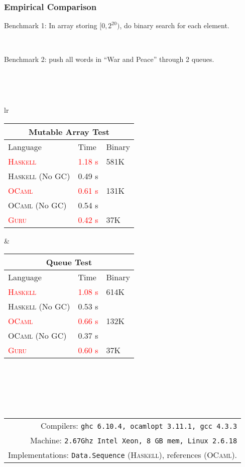 \documentclass[10pt]{beamer}
\begin{document}
\begin{frame}
\frametitle{Empirical Comparison}
Benchmark 1: In array storing $[0,2^{20})$, do binary search for each element.

\ 

Benchmark 2: push all words in ``War and Peace'' through 2 queues.

\ 

\ 


{\footnotesize
\begin{tabular}{lr}
\begin{tabular}{| l | l | l |}
\hline
\multicolumn{3}{|c|}{Mutable Array Test} \\
\hline
Language & Time & Binary \\
\hline
\textcolor{red}{\textsc{Haskell}} & \textcolor{red}{1.18 s} & 581K\\
\textsc{Haskell} (No GC) & 0.49 s & \ \\
\textcolor{red}{\textsc{OCaml}} & \textcolor{red}{0.61 s}  & 131K\\
\textsc{OCaml} (No GC) & 0.54 s & \ \\
\textcolor{red}{\textsc{Guru}} & \textcolor{red}{0.42 s} & 37K\\
\hline
\end{tabular}
&
\begin{tabular}{| l | l | l |}
\hline
\multicolumn{3}{|c|}{Queue Test} \\
\hline
Language & Time & Binary \\
\hline
\textcolor{red}{\textsc{Haskell}} & \textcolor{red}{1.08 s} & 614K\\
\textsc{Haskell} (No GC) & 0.53 s & \ \\
\textcolor{red}{\textsc{OCaml}} & \textcolor{red}{0.66 s} & 132K\\
\textsc{OCaml} (No GC) & 0.37 s & \ \\
\textcolor{red}{\textsc{Guru}} & \textcolor{red}{0.60 s} & 37K\\
\hline
\end{tabular}
\end{tabular}
}

\ 

\ 

\ \ \ \ \ \ \ \ \ \ \ \ \ \ \ \ \ \ \ \ \ \ \ \ \ \ \ \ \ \ \ {\footnotesize
\begin{tabular}{r}
Compilers: \texttt{ghc 6.10.4, ocamlopt 3.11.1, gcc 4.3.3} \\

Machine: \texttt{2.67Ghz Intel Xeon, 8 GB mem, Linux 2.6.18} \\

Implementations: \texttt{Data.Sequence} (\textsc{Haskell}), references (\textsc{OCaml}).
\end{tabular}}

\end{frame}
\end{document}
